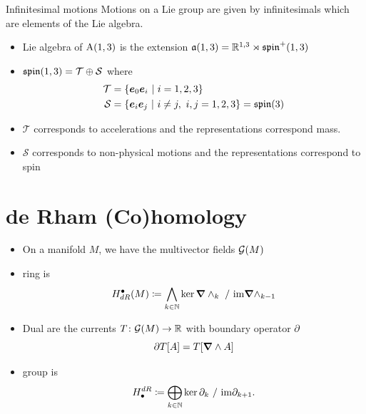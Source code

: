 \documentclass[aspectratio=169]{beamer}
\begin{document}
\begin{frame}{Infinitesimal motions}
\vfill
Motions on a Lie group are given by infinitesimals which are elements of the Lie algebra.
\begin{itemize}
	\item Lie algebra of $\operatorname{A}(1,3)$ is the extension $\mathfrak{a}(1,3)=\mathbb{R}^{1,3} \rtimes \mathfrak{spin}^+(1,3)$
	\item $\mathfrak{spin}(1,3) = \mathcal{T} \oplus \mathcal{S}$ where
	\begin{align*}
		\mathcal{T} &= \{ \boldsymbol{e}_0 \boldsymbol{e}_i ~\vert~ i=1,2,3\}\\
		\mathcal{S} &= \{ \boldsymbol{e}_i \boldsymbol{e}_j ~\vert~ i\neq j,~ i,j=1,2,3\} = \mathfrak{spin}(3)
	\end{align*}
	\item $\mathcal{T}$ corresponds to accelerations and the representations correspond mass.
	\item $\mathcal{S}$ corresponds to non-physical motions and the representations correspond to spin 
\end{itemize}
\vfill
\end{frame}



\section{de Rham (Co)homology}


\begin{frame}{}
\vfill
\begin{itemize}
    \item On a manifold $M$, we have the multivector fields $\mathcal{G}(M)$
     \item {} ring is
        \[
            H^\bullet_{dR}(M) \coloneqq \bigwedge_{k \in \mathbb{N}} \ker \boldsymbol{\nabla} \wedge_k ~/~ \mathrm{im} \boldsymbol{\nabla} \wedge_{k-1}
        \]
    \item Dual are the currents $T\colon \mathcal{G}(M) \to \mathbb{R}$ with boundary operator $\partial$
        \[
            \partial T[A] = T[\boldsymbol{\nabla} \wedge A]
        \]
        \item {} group is
        \[
            H_\bullet^{dR}  \coloneqq \bigoplus_{k\in \mathbb{N}} \ker \partial_k ~/~ \mathrm{im} \partial_{k+1}. 
        \]
\end{itemize}
\vfill
\end{frame}
\end{document}
